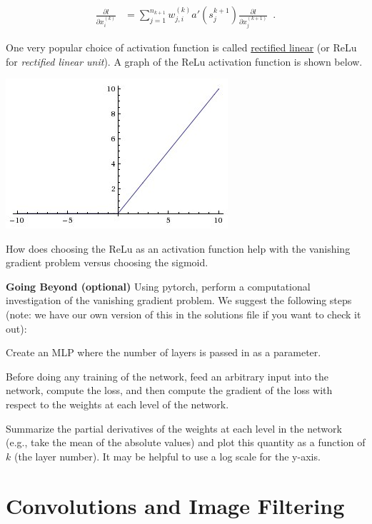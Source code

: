\documentclass[assignment07_Solutions]{subfiles}
\begin{document}
\begin{exercise}[(30-90 minutes)]
\begin{align}
\frac{\partial l}{\partial x^{(k)}_i} &= \sum_{j=1}^{n_{k+1}} w^{(k)}_{j,i} a' \left ( s_{j}^{k+1} \right)  \frac{\partial l}{\partial x^{(k+1)}_j} \label{eq:recursion2} \enspace .
\end{align}


One very popular choice of activation function is called \href{https://en.wikipedia.org/wiki/Rectifier_(neural_networks)}{rectified linear} (or ReLu for \emph{rectified linear unit}).  A graph of the ReLu activation function is shown below.

\begin{center}
\includegraphics[width=0.4\linewidth]{figures/relu}
\end{center}

How does choosing the ReLu as an activation function help with the vanishing gradient problem versus choosing the sigmoid.

\item \textbf{Going Beyond (optional)} Using pytorch, perform a computational investigation of the vanishing gradient problem.  We suggest the following steps (note: we have our own version of this in the solutions file if you want to check it out):
\bi
\item Create an MLP where the number of layers is passed in as a parameter.
\item Before doing any training of the network, feed an arbitrary input into the network, compute the loss, and then compute the gradient of the loss with respect to the weights at each level of the network.
\item Summarize the partial derivatives of the weights at each level in the network (e.g., take the mean of the absolute values) and plot this quantity as a function of $k$ (the layer number).  It may be helpful to use a log scale for the y-axis.
\ei
\ees

\end{exercise}

\section{Convolutions and Image Filtering}
\end{document}
